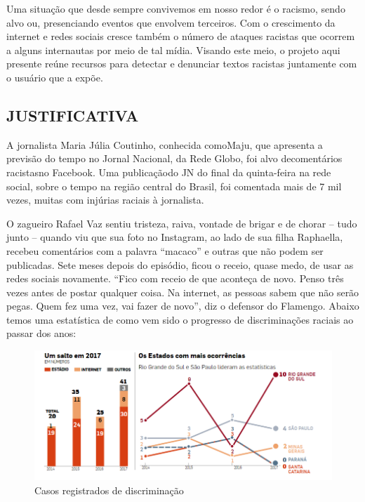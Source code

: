 \documentclass[12pt, a4paper]{article}
\begin{document}
\hspace*{0.8cm}Uma situação que desde sempre convivemos em nosso redor é o racismo, sendo alvo ou, presenciando eventos que envolvem terceiros. Com o crescimento da internet e redes sociais cresce também o número de ataques racistas que ocorrem a alguns internautas por meio de tal mídia. Visando este meio, o projeto aqui presente reúne recursos para detectar e denunciar textos racistas juntamente com o usuário que a expõe. 

\subsection{JUSTIFICATIVA}

\hspace*{0.8cm}A jornalista Maria Júlia Coutinho, conhecida comoMaju, que apresenta a previsão do tempo no Jornal Nacional, da Rede Globo, foi alvo decomentários racistasno Facebook. Uma publicaçãodo JN do final da quinta-feira na rede social, sobre o tempo na região central do Brasil, foi comentada mais de 7 mil vezes, muitas com injúrias raciais à jornalista.

O zagueiro Rafael Vaz sentiu tristeza, raiva, vontade de brigar e de chorar – tudo junto – quando viu que sua foto no Instagram, ao lado de sua filha Raphaella, recebeu comentários com a palavra “macaco” e outras que não podem ser publicadas. Sete meses depois do episódio, ficou o receio, quase medo, de usar as redes sociais novamente. “Fico com receio de que aconteça de novo. Penso três vezes antes de postar qualquer coisa. Na internet, as pessoas sabem que não serão pegas. Quem fez uma vez, vai fazer de novo”, diz o defensor do Flamengo. 
Abaixo temos uma estatística de como vem sido o progresso de discriminações raciais ao passar dos anos:

\begin{figure}[H]
\centering
\includegraphics[width=.75\textwidth]{estatistica_estadao.png}
\caption{Casos registrados de discriminação}
\label{fig:Fig2}
\end{figure}
\end{document}
